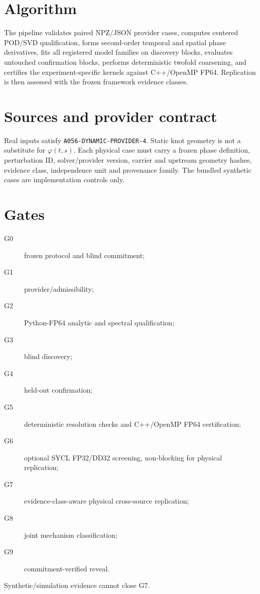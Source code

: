 \documentclass[11pt,a4paper]{article}
\newcommand{\code}[1]{\texttt{#1}}
\begin{document}
\section{Algorithm}
The pipeline validates paired NPZ/JSON provider cases, computes centered POD/SVD qualification, forms second-order temporal and spatial phase derivatives, fits all registered model families on discovery blocks, evaluates untouched confirmation blocks, performs deterministic twofold coarsening, and certifies the experiment-specific kernels against C++/OpenMP FP64. Replication is then assessed with the frozen framework evidence classes.


\section{Sources and provider contract}
Real inputs satisfy \code{A056-DYNAMIC-PROVIDER-4}. Static knot geometry is not a substitute for $\varphi(t,s)$. Each physical case must carry a frozen phase definition, perturbation ID, solver/provider version, carrier and upstream geometry hashes, evidence class, independence unit and provenance family. The bundled synthetic cases are implementation controls only.

\section{Gates}
\begin{description}
\item[G0] frozen protocol and blind commitment;
\item[G1] provider/admissibility;
\item[G2] Python-FP64 analytic and spectral qualification;
\item[G3] blind discovery;
\item[G4] held-out confirmation;
\item[G5] deterministic resolution checks and C++/OpenMP FP64 certification;
\item[G6] optional SYCL FP32/DD32 screening, non-blocking for physical replication;
\item[G7] evidence-class-aware physical cross-source replication;
\item[G8] joint mechanism classification;
\item[G9] commitment-verified reveal.
\end{description}
Synthetic/simulation evidence cannot close G7.
\end{document}
